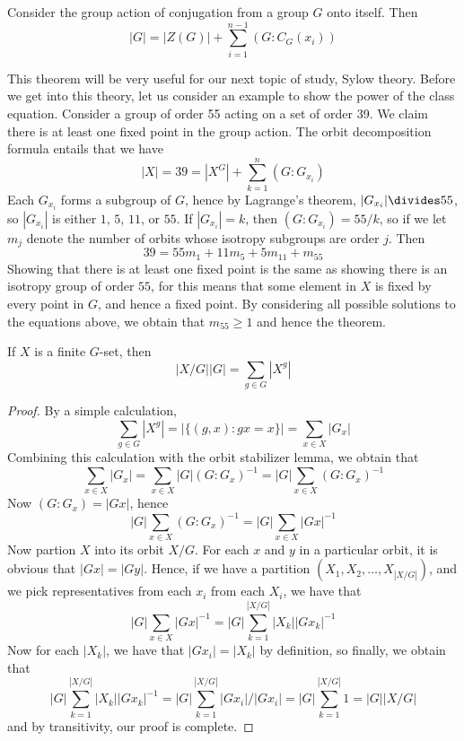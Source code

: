 \begin{corollary} 
    Consider the group action of conjugation from a group $G$ onto itself. Then
    \[ |G| = |Z(G)| + \sum_{i = 1}^{n-1} (G:C_G(x_i)) \]
\end{corollary}

This theorem will be very useful for our next topic of study, Sylow theory. Before we get into this theory, let us consider an example to show the power of the class equation. Consider a group of order 55 acting on a set of order 39. We claim there is at least one fixed point in the group action. The orbit decomposition formula entails that we have
%
\[ |X| = 39 = |X^G| + \sum_{k=1}^n (G:G_{x_i}) \]
%
Each $G_{x_i}$ forms a subgroup of $G$, hence by Lagrange's theorem, $|G_{x_i}| \divides 55$, so $|G_{x_i}|$ is either $1$, $5$, $11$, or $55$. If $|G_{x_i}| = k$, then $(G:G_{x_i}) = 55/k$, so if we let $m_j$ denote the number of orbits whose isotropy subgroups are order $j$. Then
%
\[ 39 = 55m_1 + 11m_5 + 5m_{11} + m_{55} \]
%
Showing that there is at least one fixed point is the same as showing there is an isotropy group of order $55$, for this means that some element in $X$ is fixed by every point in $G$, and hence a fixed point. By considering all possible solutions to the equations above, we obtain that $m_{55} \geq 1$ and hence the theorem.

\begin{lemma} 
    If $X$ is a finite $G$-set, then
    \[ |X/G||G| = \sum_{g \in G} |X^g| \]
\end{lemma}
\begin{proof}
    By a simple calculation,
    \[ \sum_{g \in G} |X^g| = |\{(g,x): gx = x\}| = \sum_{x \in X} |G_x| \]
    Combining this calculation with the orbit stabilizer lemma, we obtain that
    \[ \sum_{x \in X} |G_x| = \sum_{x \in X} |G|(G:G_x)^{-1} = |G| \sum_{x \in X} (G:G_x)^{-1} \]
    Now $(G:G_x) = |Gx|$, hence
    \[ |G| \sum_{x \in X} (G:G_x)^{-1} = |G| \sum_{x \in X} |Gx|^{-1} \]
    Now partion $X$ into its orbit $X/G$. For each $x$ and $y$ in a particular orbit, it is obvious that $|Gx| = |Gy|$. Hence, if we have a partition $(X_1, X_2, \dots, X_{|X/G|})$, and we pick representatives from each $x_i$ from each $X_i$, we have that
    \[ |G| \sum_{x \in X} |Gx|^{-1} = |G| \sum_{k = 1}^{|X/G|} |X_k||Gx_k|^{-1} \]
    Now for each $|X_k|$, we have that $|Gx_i| = |X_k|$ by definition, so finally, we obtain that
    \[ |G| \sum_{k = 1}^{|X/G|} |X_k||Gx_k|^{-1} = |G| \sum_{k = 1}^{|X/G|} |Gx_i|/|Gx_i| = |G| \sum_{k = 1}^{|X/G|} 1 = |G||X/G| \]
    and by transitivity, our proof is complete.
\end{proof}





